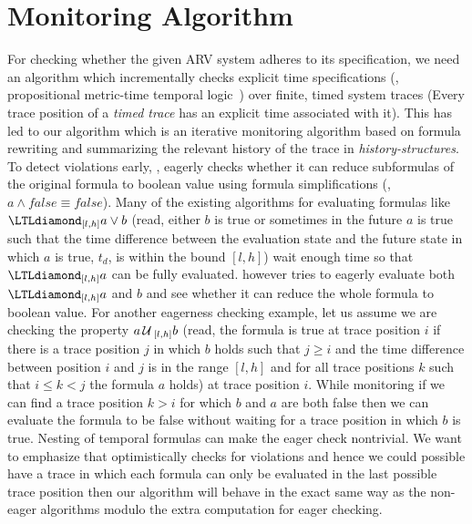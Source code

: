 
\section{Monitoring Algorithm}

For checking whether the given ARV system  adheres to its specification,
we need an algorithm which %
incrementally checks explicit time specifications (\ie, propositional metric-time temporal logic~\cite{Koymans1990})
over finite, timed system traces (Every trace position of a \emph{timed trace} has an explicit time associated with it).
This has led to our algorithm \monitor which is an iterative monitoring algorithm based on formula rewriting and summarizing the relevant history of the trace
in \emph{history-structures}. To detect violations early, \monitor, eagerly checks whether it can reduce subformulas of the original formula to boolean value
using formula simplifications (\eg, $a\wedge \mathit{false} \equiv \mathit{false}$).
Many of the existing algorithms for evaluating formulas like $\eventually_{[l,h]} a \vee b$
(read, either $b$ is true or sometimes in the future $a$ is true such that the time difference
between the evaluation state and the future state in which $a$ is true, $t_d$, is within the
bound $[l,h]$) wait enough time so that $\eventually_{[l,h]} a$ can be fully evaluated.
\monitor however tries to eagerly evaluate both $\eventually_{[l,h]} a$ and $b$ and see
whether it can reduce the whole formula to boolean value.
For another eagerness checking example,
let us assume we are checking the property $a\,\mathrm{\cal U}\,_{[l, h]}b$ (read, the formula is true at trace position $i$ if there is a trace position
$j$ in which $b$ holds such that $j\geq i$ and the time difference between position $i$ and $j$ is in the range $[l,h]$
and for all trace positions $k$ such that $i\leq k < j$ the formula $a$ holds) at trace position $i$.
While monitoring if we can find a trace position $k > i$ for which $b$ and $a$ are both false then we can evaluate the formula to be
false without waiting for a trace position in which $b$ is true. Nesting of  temporal formulas can make the eager check nontrivial.
We want to emphasize that \monitor optimistically
checks for violations and hence we could possible have a trace in which each formula can only be evaluated in
the last possible trace position then our algorithm will behave in the exact same way as the non-eager
algorithms modulo the extra computation for eager checking.
%

